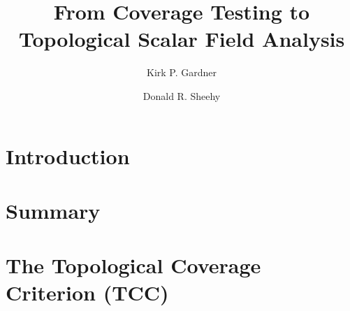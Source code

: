\documentclass[a4paper,UKenglish,cleveref, autoref, thm-restate]{lipics/socg-lipics-v2019}
\title{From Coverage Testing to Topological Scalar Field Analysis} %
\author{Kirk P. Gardner}{North Carolina State University, United States}{kpgardn2@ncsu.edu}{[orcid]}{[funding]}%
\author{Donald R. Sheehy}{North Carolina State University, United States}{don.r.sheehy@gmail.com}{[orcid]}{[funding]}
\begin{document}
\maketitle



\section{Introduction}\label{sec:introduction}
  
  

%     
%     
%     
%     
%     

\section{Summary}\label{sec:summary}


\section{The Topological Coverage Criterion (TCC)}\label{sec:tcc}

\end{document}

